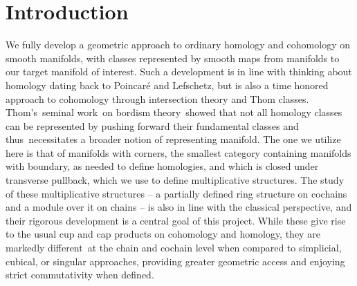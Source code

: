 
\section{Introduction}\label{intro}

We fully develop a geometric approach to ordinary homology and cohomology on smooth manifolds, with classes represented by smooth maps from manifolds to our target manifold of interest.
Such a development is in line with thinking about homology dating back to Poincar\'e and Lefschetz, but is also a time honored approach to cohomology through intersection theory and Thom classes.
Thom's seminal work on bordism theory showed that not all homology classes can be represented by pushing forward their fundamental classes and thus necessitates a broader notion of representing manifold.
The one we utilize here is that of manifolds with corners, the smallest category containing manifolds with boundary, as needed to define homologies, and which is closed under transverse pullback, which we use to define multiplicative structures.
The study of these multiplicative structures -- a partially defined ring structure on cochains and a module over it on chains -- is also in line with the classical perspective, and their rigorous development is a central goal of this project.
While these give rise to the usual cup and cap products on cohomology and homology, they are markedly different at the chain and cochain level when compared to simplicial, cubical, or singular approaches, providing greater geometric access and enjoying strict commutativity when defined.

